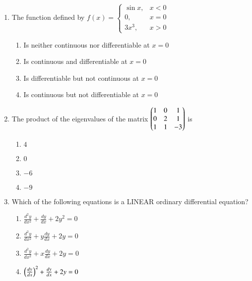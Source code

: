 \documentclass[journal]{IEEEtran}
\begin{document}
\begin{enumerate}
\setcounter{enumi}{0}
 
    \item The function defined by
    $
    f(x)=
    \begin{cases}
        \sin x, & x<0 \\
        0, & x=0\\
        3x^3, & x>0
    \end{cases}$

        \begin{enumerate}
            \item Is neither continuous nor differentiable at $x=0$
            \item Is continuous and differentiable at $x=0$
            \item Is differentiable but not continuous at $x=0$
            \item Is continuous but not differentiable at $x=0$
        \end{enumerate}

    \item The product of the eigenvalues of the matrix $\begin{pmatrix}1 & 0 & 1 \\ 0 & 2 & 1 \\ 1 & 1 & -3\end{pmatrix}$ is
    
        \begin{multicols}{4}
            \begin{enumerate}
                \item $4$
                \item $0$
                \item $-6$
                \item $-9$
            \end{enumerate}
        \end{multicols}

    \item Which of the following equations is a LINEAR ordinary differential equation?

        \begin{multicols}{2}
            \begin{enumerate}
                \item $\frac{d^2y}{dx^2}+\frac{dy}{dx}+2y^2=0$
                \item $\frac{d^2y}{dx^2}+y\frac{dy}{dx}+2y=0$
                \item $\frac{d^2y}{dx^2}+x\frac{dy}{dx}+2y=0$
                \item $\left(\frac{dy}{dx}\right)^2+\frac{dy}{dx}+2y=0$
            \end{enumerate}
        \end{multicols}


\end{enumerate}
\end{document}
